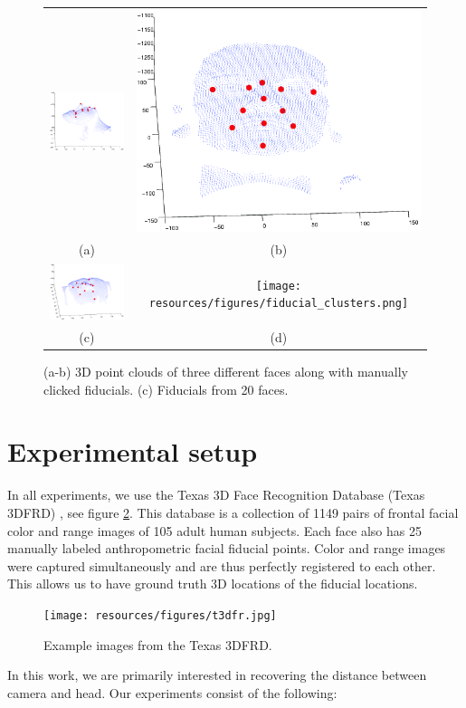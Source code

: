 \documentclass[runningheads]{llncs}
\begin{document}
\begin{figure}[h]
\centering
\begin{tabular}{cc}
\includegraphics[width=.3\linewidth]{resources/figures/face1.png} &
\includegraphics[width=.3\linewidth]{resources/figures/face2.png} \\
(a) & (b) \\
\includegraphics[width=.3\linewidth]{resources/figures/face3.png} &
\texttt{[image: resources/figures/fiducial\_clusters.png]} \\
(c) & (d)
\end{tabular}
\caption{(a-b) 3D point clouds of three different faces along with manually clicked fiducials.  (c) Fiducials from 20 faces.}
\label{fig:fiducial_clusters}
\end{figure}

\section{Experimental setup}
In all experiments, we use the Texas 3D Face Recognition Database (Texas 3DFRD) \cite{gupta2010texas}, see figure \ref{fig:t3dfrd}.  
This database is a collection of 1149 pairs of frontal facial color and range images of 105 adult human subjects.  
Each face also has 25 manually labeled anthropometric facial fiducial points.  
Color and range images were captured simultaneously and are thus perfectly registered to each other.  
This allows us to have ground truth 3D locations of the fiducial locations.  
\begin{figure}[h]
\centering
\texttt{[image: resources/figures/t3dfr.jpg]}
\caption{Example images from the Texas 3DFRD.}
\label{fig:t3dfrd}
\end{figure}
In this work, we are primarily interested in recovering the distance between camera and head.  Our experiments consist of the following:
\end{document}
